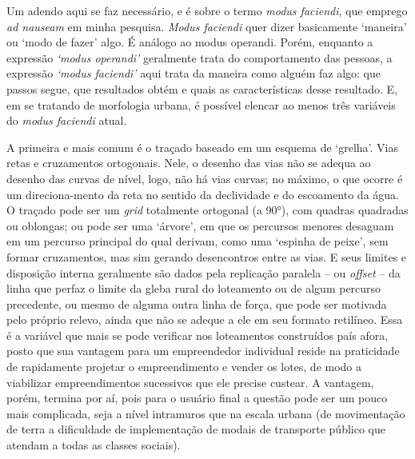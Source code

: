 \documentclass[twoside, 12pt, english,italian,latin,greek,french,spanish,brazil]{book}
\begin{document}
        Um adendo aqui se faz necessário, e é sobre o termo \textit{modus faciendi}, que emprego \textit{ad nauseam} em minha pesquisa. \textit{Modus faciendi} quer dizer basicamente ‘maneira’ ou ‘modo de fazer’ algo. É análogo ao modus operandi. Porém, enquanto a expressão \textit{‘modus operandi’} geralmente trata do comportamento das pessoas, a expressão \textit{‘modus faciendi’} aqui trata da maneira como alguém faz algo: que passos segue, que resultados obtém e quais as características desse resultado. E, em se tratando de morfologia urbana, é possível elencar ao menos três variáveis do \textit{modus faciendi} atual.

        A primeira e mais comum é o traçado baseado em um esquema de ‘grelha’. Vias retas e cruzamentos ortogonais. Nele, o desenho das vias não se adequa ao desenho das curvas de nível, logo, não há vias curvas; no máximo, o que ocorre é um direciona-mento da reta no sentido da declividade e do escoamento da água. O traçado pode ser um \textit{grid} totalmente ortogonal (a 90°), com quadras quadradas ou oblongas; ou pode ser uma ‘árvore’, em que os percursos menores desaguam em um percurso principal do qual derivam, como uma ‘espinha de peixe’, sem formar cruzamentos, mas sim gerando desencontros entre as vias. E seus limites e disposição interna geralmente são dados pela replicação paralela – ou \textit{offset} – da linha que perfaz o limite da gleba rural do loteamento ou de algum percurso precedente, ou mesmo de alguma outra linha de força, que pode ser motivada pelo próprio relevo, ainda que não se adeque a ele em seu formato retilíneo. Essa é a variável que mais se pode verificar nos loteamentos construídos país afora, posto que sua vantagem para um empreendedor individual reside na praticidade de rapidamente projetar o empreendimento e vender os lotes, de modo a viabilizar empreendimentos sucessivos que ele precise custear. A vantagem, porém, termina por aí, pois para o usuário final a questão pode ser um pouco mais complicada, seja a nível intramuros que na escala urbana (de movimentação de terra a dificuldade de implementação de modais de transporte público que atendam a todas as classes sociais).
\end{document}
